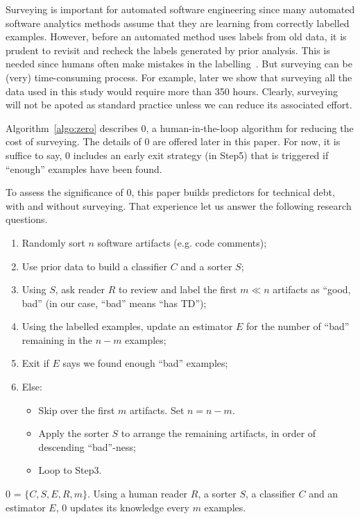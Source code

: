 \documentclass[10pt,conference]{IEEEtran}
\newcommand{\bi}{\begin{itemize}}
\newcommand{\ei}{\end{itemize}}
\newcommand{\be}{\begin{enumerate}}
\newcommand{\ee}{\end{enumerate}}
\begin{document}

Surveying is important for automated software engineering
since many automated software analytics methods
assume that they are learning from correctly labelled examples.
However, before
an automated method uses labels from old data,   it is prudent to
revisit and recheck
the labels generated  by  prior analysis.
This is needed since humans often make mistakes in the labelling~\cite{hatton2008testing}. 
  But surveying can be  (very)
  time-consuming process. For example,
  later we show that surveying
  all the data used in this study would
  require more than 350 hours.
Clearly, surveying will not be apoted as standard
practice unless   we  can reduce its associated effort. 
  
  Algorithm~\ref{algo:zero} describes {\IT}0, a human-in-the-loop algorithm   for
  reducing the cost of surveying.
  The details of {\IT}0 are offered later in this paper.
For now, it is suffice to say,
 {\IT}0 includes an early exit strategy  (in Step5)
that is triggered
 if  ``enough'' examples have been found.
  
To assess the significance of {\IT}0, this paper builds predictors
for technical debt, with and without surveying. That experience let us answer the following research questions.

 
 
\begin{algorithm}[!b]
 \small
  \be   
  \item Randomly sort   $n$ software artifacts (e.g. code comments);
  \item Use prior data to build a classifier $C$ and a sorter $S$;
  \item Using $S$, ask reader $R$ to review  and label the first $m \ll n$ artifacts as ``good, bad'' (in our case, ``bad'' means ``has TD'');
  \item Using the labelled examples, update  an estimator $E$
  for the number of ``bad''  remaining in the  $n-m$ examples;
  \item Exit if $E$ says we found enough
  ``bad'' examples;
  \item Else:
   \bi
  \item Skip over the  first $m$ artifacts. Set $n=n-m$.
  \item Apply the sorter $S$ to arrange the 
  remaining artifacts,  in order
 of descending  ``bad''-ness; 
  \item
 Loop to Step3.
  \ei
  \ee
  \caption{  {\IT}0 = $\{C,S,E,R,m\}$. Using a human reader $R$, 
  a sorter $S$, a classifier $C$ and an estimator $E$, {\IT}0 updates its knowledge  every $m$ examples.}\label{algo:zero}
  \end{algorithm}
\end{document}
